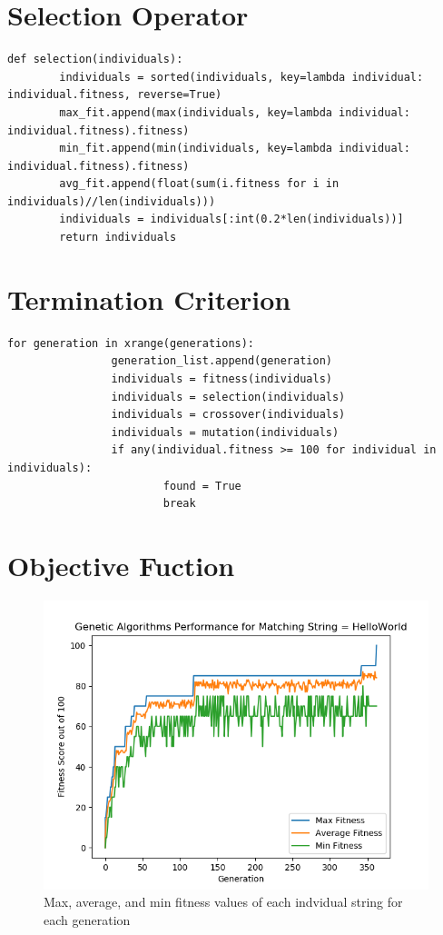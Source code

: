 \documentclass[12pt]{article}
\begin{document}
\section{Selection Operator}

\begin{lstlisting}[caption = {}]
def selection(individuals):
        individuals = sorted(individuals, key=lambda individual: individual.fitness, reverse=True)
        max_fit.append(max(individuals, key=lambda individual: individual.fitness).fitness)
        min_fit.append(min(individuals, key=lambda individual: individual.fitness).fitness)
        avg_fit.append(float(sum(i.fitness for i in individuals)//len(individuals)))
        individuals = individuals[:int(0.2*len(individuals))]
        return individuals
\end{lstlisting}

\section{Termination Criterion}

\begin{lstlisting}[caption={}]
 for generation in xrange(generations):
                generation_list.append(generation)
                individuals = fitness(individuals)
                individuals = selection(individuals)
                individuals = crossover(individuals)
                individuals = mutation(individuals)
                if any(individual.fitness >= 100 for individual in individuals):
                        found = True
                        break
\end{lstlisting}
\section{Objective Fuction}

\begin{figure}[h!]
        \centering
        \includegraphics[width=\textwidth]{figures/Figure_3.png}
        \caption{Max, average, and min fitness values of each indvidual string
for each generation}
        \label{fig:fitness}
\end{figure}
\end{document}
